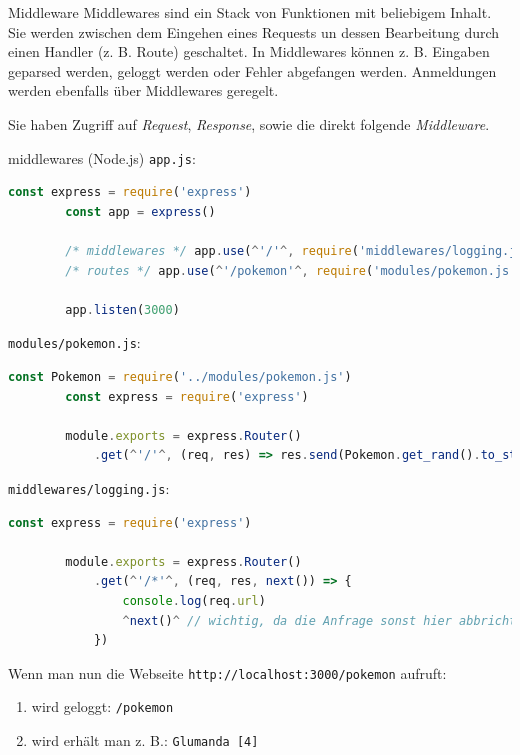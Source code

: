 \begin{defi}{Middleware}
    Middlewares sind ein Stack von Funktionen mit beliebigem Inhalt.
    Sie werden zwischen dem Eingehen eines Requests un dessen Bearbeitung durch einen Handler (z. B. Route) geschaltet.
    In Middlewares können z. B. Eingaben geparsed werden, geloggt werden oder Fehler abgefangen werden.
    Anmeldungen werden ebenfalls über Middlewares geregelt.

    Sie haben Zugriff auf \emph{Request}, \emph{Response}, sowie die direkt folgende \emph{Middleware}.
\end{defi}

\begin{example}{middlewares (Node.js)}
    \texttt{app.js}:
    \begin{lstlisting}[language=JavaScript]
        const express = require('express')
        const app = express()

        /* middlewares */ app.use(^'/'^, require('middlewares/logging.js')) // 1.
        /* routes */ app.use(^'/pokemon'^, require('modules/pokemon.js')) // 2.

        app.listen(3000)
    \end{lstlisting}

    \texttt{modules/pokemon.js}:
    \begin{lstlisting}[language=JavaScript]
        const Pokemon = require('../modules/pokemon.js')
        const express = require('express')
        
        module.exports = express.Router()
            .get(^'/'^, (req, res) => res.send(Pokemon.get_rand().to_string()) )
    \end{lstlisting}

    \texttt{middlewares/logging.js}:
    \begin{lstlisting}[language=JavaScript]
        const express = require('express')
        
        module.exports = express.Router()
            .get(^'/*'^, (req, res, next()) => {
                console.log(req.url)
                ^next()^ // wichtig, da die Anfrage sonst hier abbricht
            })
    \end{lstlisting}

    Wenn man nun die Webseite \texttt{http://localhost:3000/pokemon} aufruft:
    \begin{enumerate}
        \item wird geloggt: \texttt{/pokemon}
        \item wird erhält man z. B.: \texttt{Glumanda [4]}
    \end{enumerate}
\end{example}

